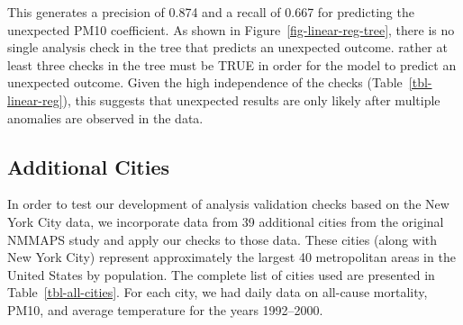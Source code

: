 \documentclass[
  12pt,
]{interact}
\begin{document}
This generates a precision of 0.874 and a recall of 0.667 for predicting
the unexpected PM10 coefficient. As shown in
Figure~\ref{fig-linear-reg-tree}, there is no single analysis check in
the tree that predicts an unexpected outcome. rather at least three
checks in the tree must be TRUE in order for the model to predict an
unexpected outcome. Given the high independence of the checks
(Table~\ref{tbl-linear-reg}), this suggests that unexpected results are
only likely after multiple anomalies are observed in the data.

\subsection{Additional Cities}\label{additional-cities}

In order to test our development of analysis validation checks based on
the New York City data, we incorporate data from 39 additional cities
from the original NMMAPS study and apply our checks to those data. These
cities (along with New York City) represent approximately the largest 40
metropolitan areas in the United States by population. The complete list
of cities used are presented in Table~\ref{tbl-all-cities}. For each
city, we had daily data on all-cause mortality, PM10, and average
temperature for the years 1992--2000.
\end{document}
